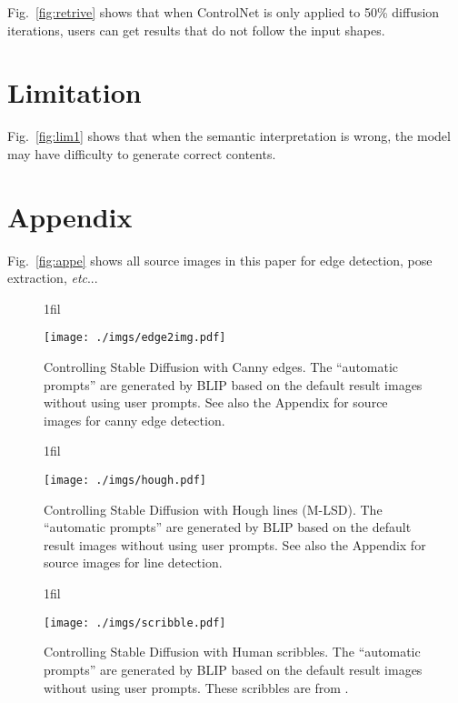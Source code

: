 \documentclass{article}
\makeatletter
\DeclareRobustCommand\onedot{\futurelet\@let@token\@onedot}
\def\@onedot{\ifx\@let@token.\else.\null\fi\xspace}
\def\etc{\emph{etc}\onedot}
\newcommand*{\centerfloat}{%
	\parindent \z@
	\leftskip \z@ \@plus 1fil \@minus \textwidth
	\rightskip\leftskip
	\parfillskip \z@skip}
\makeatother
\begin{document}
Fig.~\ref{fig:retrive} shows that when ControlNet is only applied to 50\% diffusion iterations, users can get results that do not follow the input shapes.

\section{Limitation}

Fig.~\ref{fig:lim1} shows that when the semantic interpretation is wrong, the model may have difficulty to generate correct contents.

\section*{Appendix}

Fig.~\ref{fig:appe} shows all source images in this paper for edge detection, pose extraction, \etc.

\begin{figure}
\vspace{-35pt}
\centerfloat
\begin{minipage}{1.4\linewidth}
\texttt{[image: ./imgs/edge2img.pdf]}
\caption{Controlling Stable Diffusion with Canny edges. The ``automatic prompts'' are generated by BLIP based on the default result images without using user prompts. See also the Appendix for source images for canny edge detection.}
\label{fig:edge2img} 
\end{minipage}
\end{figure}

\begin{figure}
	\centerfloat
	\begin{minipage}{1.4\linewidth}
		\texttt{[image: ./imgs/hough.pdf]}
		\caption{Controlling Stable Diffusion with Hough lines (M-LSD). The ``automatic prompts'' are generated by BLIP based on the default result images without using user prompts. See also the Appendix for source images for line detection.}
		\label{fig:hough} 
	\end{minipage}
\end{figure}

\begin{figure}
	\centerfloat
	\begin{minipage}{1.4\linewidth}
		\texttt{[image: ./imgs/scribble.pdf]}
		\caption{Controlling Stable Diffusion with Human scribbles. The ``automatic prompts'' are generated by BLIP based on the default result images without using user prompts. These scribbles are from \cite{voynov2022sketch}.}
			\label{fig:scribble} 
	\end{minipage}

\end{figure}
\end{document}
